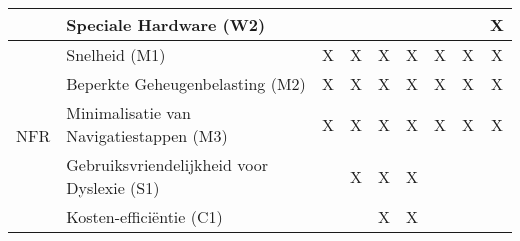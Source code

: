 \begin{table}[ht]
\begin{tabular}{|l|l|c|c|c|c|c|c|c|}
        & Speciale Hardware (W2) &  &  &  &  &  &  & X \\ \hline
        \multirow{5}{*}{NFR} & Snelheid (M1) & X & X & X & X & X & X & X \\ \cline{2-9}
        & Beperkte Geheugenbelasting (M2) & X & X & X & X & X & X & X \\ \cline{2-9}
        & Minimalisatie van Navigatiestappen (M3) & X & X & X & X & X & X & X \\ \cline{2-9}
        & Gebruiksvriendelijkheid voor Dyslexie (S1) &  & X & X & X &  &  &  \\ \cline{2-9}
        & Kosten-efficiëntie (C1) &  &  & X & X &  &  &  \\ \hline
    \end{tabular}
\end{table}

